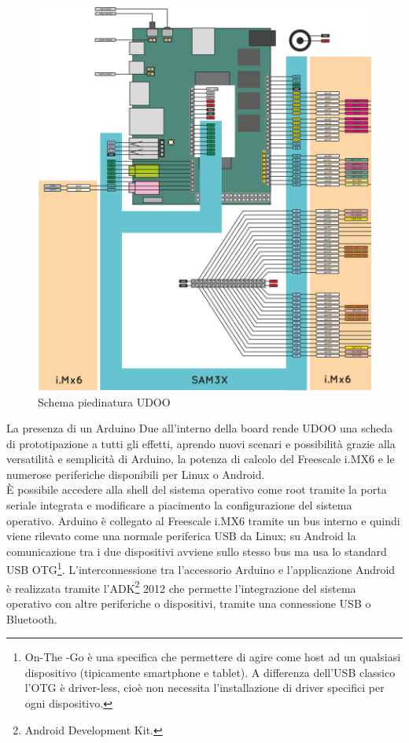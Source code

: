 \begin{figure}[!htb] \center
\includegraphics[width=\textwidth]{immagini/udoo_pinout.png}
\caption{Schema piedinatura UDOO} 
\end{figure}

La presenza di un Arduino Due all'interno della board rende UDOO una scheda di 
prototipazione a tutti gli effetti, aprendo nuovi scenari e 
possibilità grazie alla versatilità e semplicità di Arduino, la potenza di 
calcolo del Freescale i.MX6 e le numerose periferiche disponibili per Linux o 
Android.\\
È possibile accedere alla shell del 
sistema operativo come root tramite la porta seriale integrata e modificare a 
piacimento la configurazione del sistema operativo. Arduino è collegato al 
Freescale i.MX6 tramite un bus interno e quindi viene rilevato come una 
normale periferica USB da Linux; su Android la comunicazione tra i due 
dispositivi avviene sullo stesso bus ma usa lo standard USB OTG\footnote{On-The
-Go è una specifica che permettere di agire come host ad un qualsiasi  
dispositivo (tipicamente smartphone e tablet). A differenza dell'USB classico 
l'OTG è driver-less, cioè non necessita l'installazione di driver specifici 
per ogni dispositivo.}. L'interconnessione tra l'accessorio Arduino e 
l'applicazione Android è realizzata tramite l'ADK\footnote{Android Development 
Kit.} 2012 che permette l'integrazione del sistema operativo con altre periferiche 
o dispositivi, tramite una connessione USB o Bluetooth.
